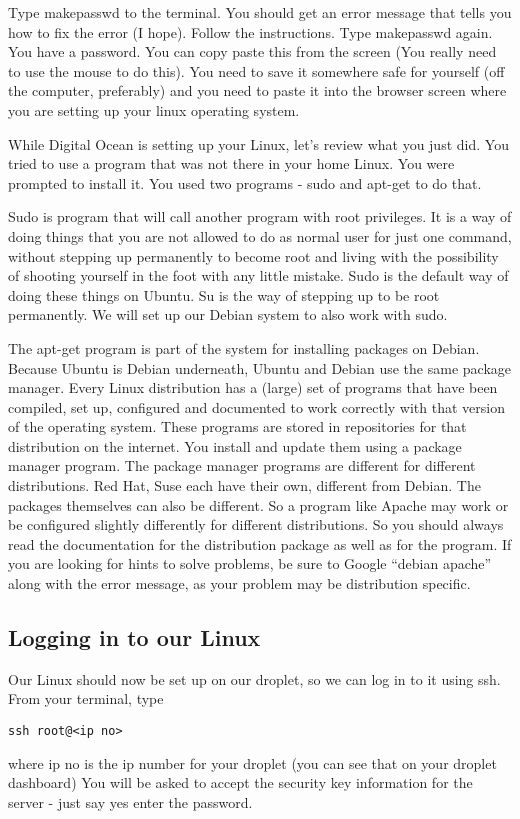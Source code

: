 \documentclass[12pt,a4paper]{article}
\begin{document}
Type makepasswd to the terminal. You should get an error message that tells you how to fix the error (I hope). Follow the instructions. Type makepasswd again. You have a password. You can copy paste this from the screen (You really need to use the mouse to do this). You need to save it somewhere safe for yourself (off the computer, preferably) and you need to paste it into the browser screen where you are setting up your linux operating system.

While Digital Ocean is setting up your Linux, let’s review what you just did. You tried to use a program that was not there in your home Linux. You were prompted to install it. You used two programs - sudo and apt-get to do that. 

Sudo is program that will call another program with root privileges. It is a way of doing things that you are not allowed to do as normal user for just one command, without stepping up permanently to become root and living with the possibility of shooting yourself in the foot with any little mistake. Sudo is the default way of doing these things on Ubuntu. Su is the way of stepping up to be root permanently. We will set up our Debian system to also work with sudo.

The apt-get program is part of the system for installing packages on Debian. Because Ubuntu is Debian underneath, Ubuntu and Debian use the same package manager. Every Linux distribution has a (large) set of programs that have been compiled, set up, configured and documented to work correctly with that version of the operating system. These programs are stored in repositories for that distribution on the internet. You install and update them using a package manager program. The package manager programs are different for different distributions. Red Hat, Suse each have their own, different from Debian. The packages themselves can also be different. So a program like Apache may work or be configured slightly differently for different distributions. So you should always read the documentation for the distribution package as well as for the program. If you are looking for hints to solve problems, be sure to Google “debian apache” along with the error message, as your problem may be distribution specific.

\subsection*{Logging in to our Linux}

Our Linux should now be set up on our droplet, so we can log in to it using ssh. From your terminal, type 
\begin{verbatim}
ssh root@<ip no>
\end{verbatim}
where ip no is the ip number for your droplet (you can see that on your droplet dashboard)
You will be asked to accept the security key information for the server  - just say yes
enter the password. 
\end{document}
